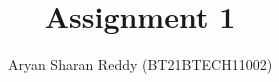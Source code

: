 \documentclass[journal,12pt,twocolumn]{IEEEtran}
\begin{document}
\let\vec\mathbf
\def\putbox#1#2#3{\makebox[0in][l]{\makebox[#1][l]{}\raisebox{\baselineskip}[0in][0in]{\raisebox{#2}[0in][0in]{#3}}}}
     \def\rightbox#1{\makebox[0in][r]{#1}}
     \def\centbox#1{\makebox[0in]{#1}}
     \def\topbox#1{\raisebox{-\baselineskip}[0in][0in]{#1}}
     \def\midbox#1{\raisebox{-0.5\baselineskip}[0in][0in]{#1}}
\title{
		Assignment 1
}
\author{ Aryan Sharan Reddy (BT21BTECH11002)%
}
%
%
%
% 
%
\end{document}
